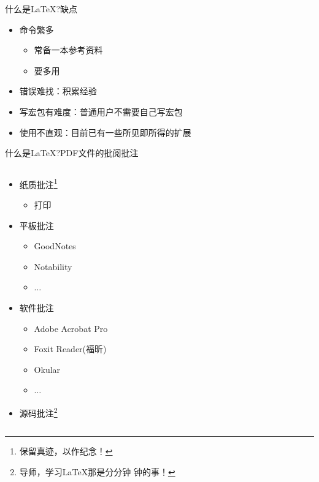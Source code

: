 \documentclass[xcolor=svgnames, t, 10pt]{ctexbeamer}%
\begin{document}
\begin{frame}[t]{什么是\LaTeX?}{缺点}
  \stretchon
  \begin{itemize}
  \item 命令繁多
    \begin{itemize}
    \item 常备一本参考资料
    \item 要\alert{多用}
    \end{itemize}
  \item 错误难找：积累经验
  \item 写宏包有难度：普通用户不需要自己写宏包
  \item 使用不直观：目前已有一些所见即所得的扩展
  \end{itemize}
  \stretchoff
\end{frame}

\begin{frame}[t]{什么是\LaTeX?}{PDF文件的批阅批注}
  \begin{columns}[c]
    \begin{spacing}{0.9}
    \begin{itemize}%
    \item \alert{纸质}批注\footnote[frame]{保留\alert{真迹}，以作纪念！}
      \begin{itemize}
      \item 打印
      \end{itemize}
    \item
      \alert{平板}批注\footnotemark[\value{footnote}]%
      \begin{itemize}
      \item GoodNotes
      \item Notability
      \item $\ldots$
      \end{itemize}
    \item \alert{软件}批注
      \begin{itemize}
      \item Adobe Acrobat Pro
      \item Foxit Reader(福昕)
      \item Okular
      \item $\ldots$
      \end{itemize}
    \item \alert{源码}批注\footnote[frame]{导师，学习\LaTeX 那是\alert{分分钟
          钟}的事！}
      \begin{itemize}

\end{itemize}
\end{itemize}
\end{spacing}
\end{columns}
\end{frame}
\end{document}
